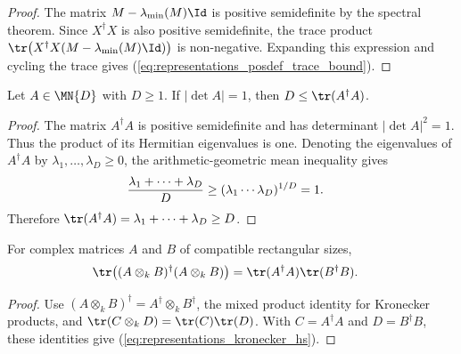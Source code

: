 \begin{proof}
    \leanok
    The matrix $M-\lambda_{\min}(M)\Id$ is positive semidefinite by the
    spectral theorem. Since $X^{\dagger}X$ is also positive semidefinite, the
    trace product
    $\tr\!\left(X^{\dagger}X(M-\lambda_{\min}(M)\Id)\right)$
    is non-negative. Expanding this expression and cycling the trace gives
    (\ref{eq:representations_posdef_trace_bound}).
\end{proof}

\begin{lemma}
\label{lem:det_amgm_hilbert_schmidt_bound}
    \leanok
    Let $A\in\MN{D}$ with $D\geq1$. If $|\det A|=1$, then
    $D\leq\tr(A^{\dagger}A)$.
\end{lemma}

\begin{proof}
    \leanok
    The matrix $A^{\dagger}A$ is positive semidefinite and has determinant
    $|\det A|^{2}=1$. Thus the product of its Hermitian eigenvalues is one.
    Denoting the eigenvalues of $A^{\dagger}A$ by
    $\lambda_{1},\ldots,\lambda_{D}\geq0$, the arithmetic-geometric mean
    inequality gives
    \begin{align}
        \frac{\lambda_{1}+\cdots+\lambda_{D}}{D}
        &\geq(\lambda_{1}\cdots\lambda_{D})^{1/D}
         =1.
        \notag
    \end{align}
    Therefore
    $\tr(A^{\dagger}A)=\lambda_{1}+\cdots+\lambda_{D}\geq D$.
\end{proof}

\begin{lemma}
\label{lem:kronecker_hilbert_schmidt_trace}
    \leanok
    For complex matrices $A$ and $B$ of compatible rectangular sizes,
    \begin{align}
        \tr\!\left((A\otimes_{k}B)^{\dagger}
            (A\otimes_{k}B)\right)
        &=\tr(A^{\dagger}A)\tr(B^{\dagger}B).
        \label{eq:representations_kronecker_hs}
    \end{align}
\end{lemma}

\begin{proof}
    \leanok
    Use
    $(A\otimes_{k}B)^{\dagger}=A^{\dagger}\otimes_{k}B^{\dagger}$, the mixed
    product identity for Kronecker products, and
    $\tr(C\otimes_{k}D)=\tr(C)\tr(D)$. With
    $C=A^{\dagger}A$ and $D=B^{\dagger}B$, these identities give
    (\ref{eq:representations_kronecker_hs}).
\end{proof}

